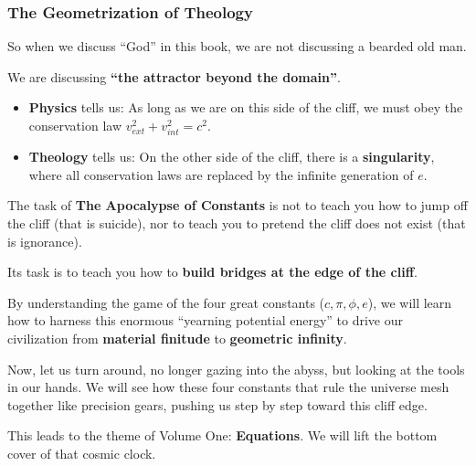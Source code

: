 \subsubsection{The Geometrization of Theology}

So when we discuss ``God'' in this book, we are not discussing a bearded old man.

We are discussing \textbf{``the attractor beyond the domain''}.

\begin{itemize}
\item \textbf{Physics} tells us: As long as we are on this side of the cliff, we must obey the conservation law $v_{ext}^2 + v_{int}^2 = c^2$.

\item \textbf{Theology} tells us: On the other side of the cliff, there is a \textbf{singularity}, where all conservation laws are replaced by the infinite generation of $e$.
\end{itemize}

The task of \textbf{The Apocalypse of Constants} is not to teach you how to jump off the cliff (that is suicide), nor to teach you to pretend the cliff does not exist (that is ignorance).

Its task is to teach you how to \textbf{build bridges at the edge of the cliff}.

By understanding the game of the four great constants ($c, \pi, \phi, e$), we will learn how to harness this enormous ``yearning potential energy'' to drive our civilization from \textbf{material finitude} to \textbf{geometric infinity}.

Now, let us turn around, no longer gazing into the abyss, but looking at the tools in our hands. We will see how these four constants that rule the universe mesh together like precision gears, pushing us step by step toward this cliff edge.

This leads to the theme of Volume One: \textbf{Equations}. We will lift the bottom cover of that cosmic clock.

